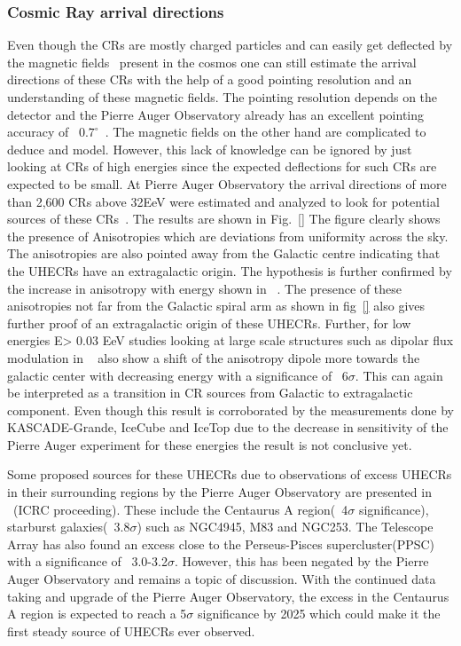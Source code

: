 \subsubsection*{Cosmic Ray arrival directions}
\label{subsubsec:CRdirec}
Even though the CRs are mostly charged particles and can easily get deflected by the magnetic fields~\cite{Ar_mburo_Garc_a_2021} present in the cosmos one can still estimate the arrival directions of these CRs with the help of a good pointing resolution and an understanding of these magnetic fields. The pointing resolution depends on the detector and the Pierre Auger Observatory already has an excellent pointing accuracy of ~$0.7^{\circ}$~\cite{BONIFAZI200920}. The magnetic fields on the other hand are complicated to deduce and model. However, this lack of knowledge can be ignored by just looking at CRs of high energies since the expected deflections for such CRs are expected to be small. At Pierre Auger Observatory the arrival directions of more than 2,600 CRs above 32EeV were estimated and analyzed to look for potential sources of these CRs~\cite{Abreu_2022}. The results are shown in Fig.~\ref{} The figure clearly shows the presence of Anisotropies which are deviations from uniformity across the sky. The anisotropies are also pointed away from the Galactic centre indicating that the UHECRs have an extragalactic origin. The hypothesis is further confirmed by the increase in anisotropy with energy shown in ~\cite{}. The presence of these anisotropies not far from the Galactic spiral arm as shown in fig~\ref{} also gives further proof of an extragalactic origin of these UHECRs. Further, for low energies E> 0.03 EeV studies looking at large scale structures such as dipolar flux modulation in ~\cite{Aab_2020_dipole_modulation} also show a shift of the anisotropy dipole more towards the galactic center with decreasing energy with a significance of ~6$\sigma$. This can again be interpreted as a transition in CR sources from Galactic to extragalactic component. Even though this result is corroborated by the measurements done by KASCADE-Grande, IceCube and IceTop due to the decrease in sensitivity of the Pierre Auger experiment for these energies the result is not conclusive yet.

Some proposed sources for these UHECRs due to observations of excess UHECRs in their surrounding regions by the Pierre Auger Observatory are presented in ~\cite{TelescopeArray:2021gxg}(ICRC proceeding). These include the Centaurus A region(~4$\sigma$ significance), starburst galaxies(~3.8$\sigma$) such as NGC4945, M83 and NGC253. The Telescope Array has also found an excess close to the Perseus-Pisces supercluster(PPSC) with a significance of ~3.0-3.2$\sigma$. However, this has been negated by the Pierre Auger Observatory and remains a topic of discussion. With the continued data taking and upgrade of the Pierre Auger Observatory, the excess in the Centaurus A region is expected to reach a 5$\sigma$ significance by 2025 which could make it the first steady source of UHECRs ever observed. 
 

